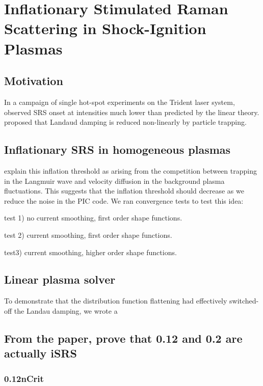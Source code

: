 \chapter{Inflationary Stimulated Raman Scattering in Shock-Ignition Plasmas}
\label{chp:iSRS}

\section{Motivation}

In a campaign of single hot-spot experiments on the Trident laser system, \cite{Montgomery2002} observed \acrshort{SRS} onset at intensities much lower than predicted by the linear theory. \cite{Vu2002} proposed that Landaud damping is reduced non-linearly by particle trapping.

\section{Inflationary SRS in homogeneous plasmas}

\cite{Vu2007} explain this inflation threshold as arising from the competition between trapping in the Langmuir wave and velocity diffusion in the background plasma fluctuations. This suggests that the inflation threshold should decrease as we reduce the noise in the PIC code. We ran convergence tests to test this idea:

test 1) no current smoothing, first order shape functions. 

test 2) current smoothing, first order shape functions.

test3) current smoothing, higher order shape functions.


\section{Linear plasma solver}
To demonstrate that the distribution function flattening had effectively switched-off the Landau damping, we wrote a 

\section{From the paper, prove that 0.12 and 0.2 are actually iSRS}
\subsection{0.12nCrit}
